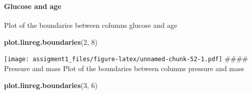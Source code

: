 \documentclass[
]{article}
\newenvironment{Shaded}{\begin{snugshade}}{\end{snugshade}}
\newcommand{\CommentTok}[1]{\textcolor[rgb]{0.56,0.35,0.01}{\textit{#1}}}
\newcommand{\DataTypeTok}[1]{\textcolor[rgb]{0.13,0.29,0.53}{#1}}
\newcommand{\DecValTok}[1]{\textcolor[rgb]{0.00,0.00,0.81}{#1}}
\newcommand{\FloatTok}[1]{\textcolor[rgb]{0.00,0.00,0.81}{#1}}
\newcommand{\KeywordTok}[1]{\textcolor[rgb]{0.13,0.29,0.53}{\textbf{#1}}}
\newcommand{\NormalTok}[1]{#1}
\newcommand{\OperatorTok}[1]{\textcolor[rgb]{0.81,0.36,0.00}{\textbf{#1}}}
\newcommand{\OtherTok}[1]{\textcolor[rgb]{0.56,0.35,0.01}{#1}}
\newcommand{\StringTok}[1]{\textcolor[rgb]{0.31,0.60,0.02}{#1}}
\begin{document}
\begin{Shaded}
\end{Shaded}

\hypertarget{section-7}{%
\subsubsection{}\label{section-7}}

\hypertarget{glucose-and-age-3}{%
\paragraph{Glucose and age}\label{glucose-and-age-3}}

Plot of the boundaries between columns glucose and age

\begin{Shaded}
\begin{Highlighting}[]
\KeywordTok{plot.linreg.boundaries}\NormalTok{(}\DecValTok{2}\NormalTok{, }\DecValTok{8}\NormalTok{)}
\end{Highlighting}
\end{Shaded}

\texttt{[image: assigment1\_files/figure-latex/unnamed-chunk-52-1.pdf]}
\#\#\#\# Pressure and mass Plot of the boundaries between columns
pressure and mass

\begin{Shaded}
\begin{Highlighting}[]
\KeywordTok{plot.linreg.boundaries}\NormalTok{(}\DecValTok{3}\NormalTok{, }\DecValTok{6}\NormalTok{)}
\end{Highlighting}
\end{Shaded}
\end{document}
